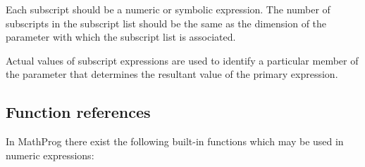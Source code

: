 \documentclass[11pt]{report}
\begin{document}
Each subscript should be a numeric or symbolic expression. The number
of subscripts in the subscript list should be the same as the dimension
of the parameter with which the subscript list is associated.

Actual values of subscript expressions are used to identify
a particular member of the parameter that determines the resultant
value of the primary expression.

\newpage

\subsection{Function references}

In MathProg there exist the following built-in functions which may be
used in numeric expressions:
\end{document}

